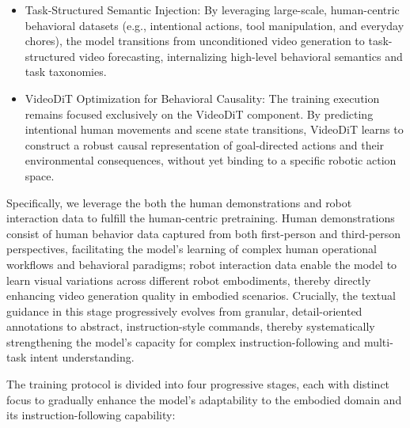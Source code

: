 \begin{itemize}
    \item Task-Structured Semantic Injection: By leveraging large-scale, human-centric behavioral datasets (e.g., intentional actions, tool manipulation, and everyday chores), the model transitions from unconditioned video generation to task-structured video forecasting, internalizing high-level behavioral semantics and task taxonomies.

\item VideoDiT Optimization for Behavioral Causality: The training execution remains focused exclusively on the VideoDiT component. By predicting intentional human movements and scene state transitions, VideoDiT learns to construct a robust causal representation of goal-directed actions and their environmental consequences, without yet binding to a specific robotic action space.
\end{itemize}

Specifically, we leverage the both the human demonstrations and robot interaction data to fulfill the human-centric pretraining. Human demonstrations consist of human behavior data captured from both first-person and third-person perspectives, facilitating the model's learning of complex human operational workflows and behavioral paradigms; robot interaction data enable the model to learn visual variations across different robot embodiments, thereby directly enhancing video generation quality in embodied scenarios. Crucially, the textual guidance in this stage progressively evolves from granular, detail-oriented annotations to abstract, instruction-style commands, thereby systematically strengthening the model's capacity for complex instruction-following and multi-task intent understanding.


The training protocol is divided into four progressive stages, each with distinct focus to gradually enhance the model’s adaptability to the embodied domain and its instruction-following capability:


